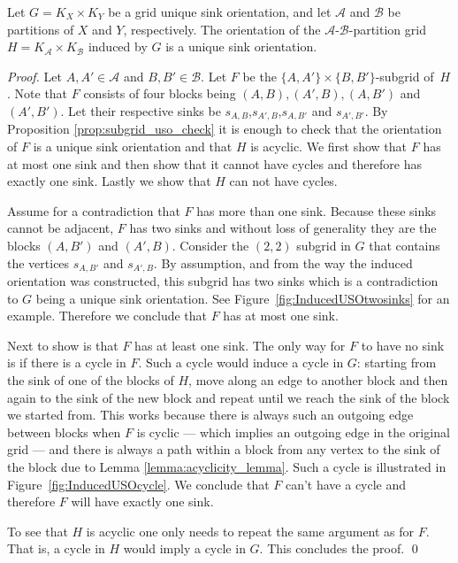 \documentclass[runningheads,a4paper]{llncs}
\newcommand{\A}{\ensuremath{\mathcal A}}
\newcommand{\B}{\ensuremath{\mathcal B}}
\newcommand{\s}[1]{\ensuremath{s_{\scriptscriptstyle#1}}}
\begin{document}
\begin{lemma}\label{lemma:USO-Lemma}
Let $G = K_X \times K_Y$ be a grid unique sink orientation,
and let $\A$ and $\B$ be partitions of $X$ and $Y$, respectively.
The orientation of the $\A$-$\B$-partition grid $H = K_\A \times K_\B$ induced by $G$ is a unique sink orientation.
\end{lemma}

\begin{proof}
Let $A, A'\in \A$ and $B,B'\in \B$. Let $F$ be the $\{A,A'\}\times\{B, B'\}$-subgrid of~$H$.
Note that $F$ consists of four blocks being $(A,B), (A', B), (A, B')$ and $(A', B')$. Let their respective sinks be $s_{A,B}$,$s_{A',B}$,$s_{A,B'}$ and $s_{A',B'}$.
By Proposition \ref{prop:subgrid_uso_check} it is enough to check that the orientation of $F$ is a unique sink orientation and that $H$ is acyclic.
We first show that $F$ has at most one sink and then show that it cannot have cycles and therefore has exactly one sink. Lastly we show that $H$ can not have cycles.

Assume for a contradiction that $F$ has more than one sink.
Because these sinks cannot be adjacent, $F$ has two sinks and without loss of generality they are the blocks $(A,B')$ and $(A', B)$. Consider the $(2,2)$ subgrid in $G$ that contains the vertices $\s{A,B'}$ and $\s{A',B}$. By assumption, and from the way the induced orientation was constructed, this subgrid has two sinks which is a contradiction to $G$ being a unique sink orientation. See Figure~\ref{fig:InducedUSOtwosinks} for an example. Therefore we conclude that $F$ has at most one sink. 

Next to show is that $F$ has at least one sink. The only way for $F$ to have no sink is if there is a cycle in $F$. Such a cycle would induce a cycle in $G$: starting from the sink of one of the blocks of $H$, move along an edge to another block and then again to the sink of the new block and repeat until we reach the sink of the block we started from. This works because there is always such an outgoing edge between blocks when $F$ is cyclic --- which implies an outgoing edge in the original grid --- and there is always a path within a block from any vertex to the sink of the block due to Lemma \ref{lemma:acyclicity_lemma}. Such a cycle is illustrated in Figure~\ref{fig:InducedUSOcycle}. We conclude that $F$ can't have a cycle and therefore $F$ will have exactly one sink.

To see that $H$ is acyclic one only needs to repeat the same argument as for $F$. That is, a cycle in $H$ would imply a cycle in $G$. This concludes the proof. \qed


\end{proof}
\end{document}
